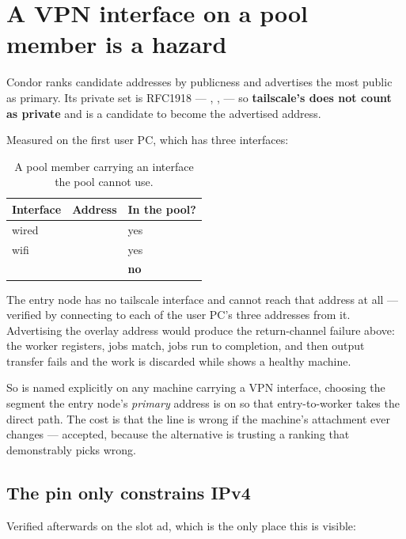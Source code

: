 \section{A VPN interface on a pool member is a hazard}
\label{sec:vpn}

Condor ranks candidate addresses by publicness and advertises the most public as
primary. Its private set is RFC1918 --- , ,
 --- so \textbf{tailscale's  does not count as
private} and is a candidate to become the advertised address.

Measured on the first user PC, which has three interfaces:

\begin{table}[H]
\centering
\begin{tabularx}{\textwidth}{L{0.22\textwidth} L{0.26\textwidth} Y}
\toprule
\textbf{Interface} & \textbf{Address} & \textbf{In the pool?} \\
\midrule
wired &  & yes \\
wifi &  & yes \\
 &  & \textbf{no} \\
\bottomrule
\end{tabularx}
\caption{A pool member carrying an interface the pool cannot use.}
\end{table}

The entry node has no tailscale interface and cannot reach that address at all
--- verified by connecting to each of the user PC's three addresses from it.
Advertising the overlay address would produce the return-channel failure above:
the worker registers, jobs match, jobs run to completion, and then output
transfer fails and the work is discarded while  shows a
healthy machine.

So  is named explicitly on any machine carrying a VPN
interface, choosing the segment the entry node's \emph{primary} address is on so
that entry-to-worker takes the direct path. The cost is that the line is wrong
if the machine's attachment ever changes --- accepted, because the alternative is
trusting a ranking that demonstrably picks wrong.

\subsection{The pin only constrains IPv4}

Verified afterwards on the slot ad, which is the only place this is visible:

